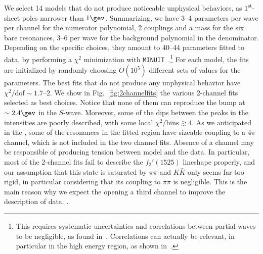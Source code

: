 We select 14 models that do not produce noticeable unphysical behaviors, as  $1^\text{st}$-sheet poles narrower than $1\gev$. 
Summarizing, we have 3--4 parameters per wave per channel for the numerator polynomial, 2 couplings and a mass for the six bare resonances, 3--6 per wave for the background polynomial in the denominator.
Depending on the specific choices, they amount to 
40--44 parameters fitted to data, by performing a $\chi^2$ minimization with {\tt MINUIT}~\cite{minuit}.\footnote{This requires systematic uncertainties and correlations between partial waves to be negligible, as found in~\cite{Schluter:2012mep}. Correlations can actually be relevant, in particular in the high energy region, as shown in~\cite{Bibrzycki:2021rwh}.}
For each model, the fits are initialized by randomly choosing $O(10^5)$ different sets of values for the parameters. The best fits that do not produce any unphysical behavior have $\chi^2/\text{dof} \sim 1.7$--$2$. 
We show in Fig.~\ref{fig:2channelfits} the various 2-channel fits selected as best choices. Notice that none of them can reproduce the bump at $\sim 2.4\gev$ in the $S$-wave. Moreover, some of the dips between the peaks in the intensities are poorly described, with some local  $\chi^2/\text{bins}\gtrsim 4$.
As we anticipated in the , some of the resonances in the fitted region have sizeable coupling to a $4\pi$ channel, which is not included in the two channel fits. Absence of a channel may be responsible 
 of producing tension between model and the data.  In particular, most of the 2-channel fits fail to describe the $f_2'(1525)$ lineshape properly, and our assumption that this state is saturated by $\pi\pi$ and $K\bar K$ only seems far too rigid, in particular considering that its coupling to $\pi\pi$ is negligible. This is the main reason why we expect the opening a third channel to improve the description of data. .

